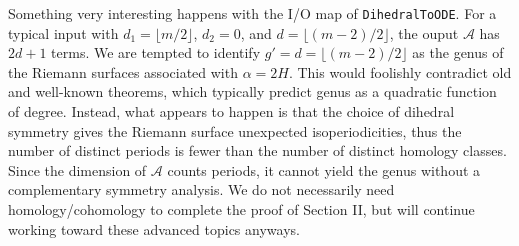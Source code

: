 \documentclass[nofootinbib,preprint]{revtex4-1}
\begin{document}
Something very interesting happens with the I/O map of \texttt{DihedralToODE}. For a
typical input with $d_1=\lfloor m/2 \rfloor$, $d_2=0$, and $d=\lfloor (m-2)/2 \rfloor$,
the ouput $\mathcal{A}$ has $2d+1$ terms. We are tempted to identify $g'=d=\lfloor(m-2)/2\rfloor$
as the genus of the Riemann surfaces associated with $\alpha=2H$. This would foolishly contradict
old and well-known theorems, which typically predict genus as a quadratic function of 
degree. Instead, what appears to happen is that the choice of dihedral symmetry gives 
the Riemann surface unexpected isoperiodicities, thus the number of distinct periods is 
fewer than the number of distinct homology classes. Since the dimension of $\mathcal{A}$ 
counts periods, it cannot yield the genus without a complementary symmetry analysis.
We do not necessarily need homology/cohomology to complete the proof of Section II, 
but will continue working toward these advanced topics anyways. 

\end{document}
